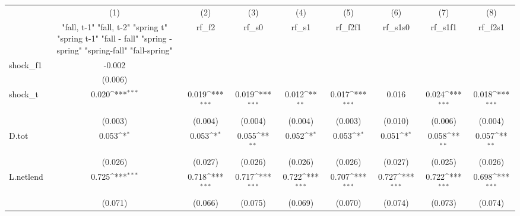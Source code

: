 {
\def\sym#1{\ifmmode^{#1}\else\(^{#1}\)\fi}
\begin{tabular}{l*{8}{c}}
\toprule
            &\multicolumn{1}{c}{(1)}&\multicolumn{1}{c}{(2)}&\multicolumn{1}{c}{(3)}&\multicolumn{1}{c}{(4)}&\multicolumn{1}{c}{(5)}&\multicolumn{1}{c}{(6)}&\multicolumn{1}{c}{(7)}&\multicolumn{1}{c}{(8)}\\
            &\multicolumn{1}{c}{  "fall, t-1" "fall, t-2" "spring t" "spring t-1"  "fall - fall" "spring - spring" "spring-fall" "fall-spring" }&\multicolumn{1}{c}{rf\_f2}&\multicolumn{1}{c}{rf\_s0}&\multicolumn{1}{c}{rf\_s1}&\multicolumn{1}{c}{rf\_f2f1}&\multicolumn{1}{c}{rf\_s1s0}&\multicolumn{1}{c}{rf\_s1f1}&\multicolumn{1}{c}{rf\_f2s1}\\
\midrule
shock\_f1    &      -0.002         &                     &                     &                     &                     &                     &                     &                     \\
            &     (0.006)         &                     &                     &                     &                     &                     &                     &                     \\
\addlinespace
shock\_t     &       0.020\sym{***}&       0.019\sym{***}&       0.019\sym{***}&       0.012\sym{**} &       0.017\sym{***}&       0.016         &       0.024\sym{***}&       0.018\sym{***}\\
            &     (0.003)         &     (0.004)         &     (0.004)         &     (0.004)         &     (0.003)         &     (0.010)         &     (0.006)         &     (0.004)         \\
\addlinespace
D.tot       &       0.053\sym{*}  &       0.053\sym{*}  &       0.055\sym{**} &       0.052\sym{*}  &       0.053\sym{*}  &       0.051\sym{*}  &       0.058\sym{**} &       0.057\sym{**} \\
            &     (0.026)         &     (0.027)         &     (0.026)         &     (0.026)         &     (0.026)         &     (0.027)         &     (0.025)         &     (0.026)         \\
\addlinespace
L.netlend   &       0.725\sym{***}&       0.718\sym{***}&       0.717\sym{***}&       0.722\sym{***}&       0.707\sym{***}&       0.727\sym{***}&       0.722\sym{***}&       0.698\sym{***}\\
            &     (0.071)         &     (0.066)         &     (0.075)         &     (0.069)         &     (0.070)         &     (0.074)         &     (0.073)         &     (0.074)         \\

\end{tabular}}
